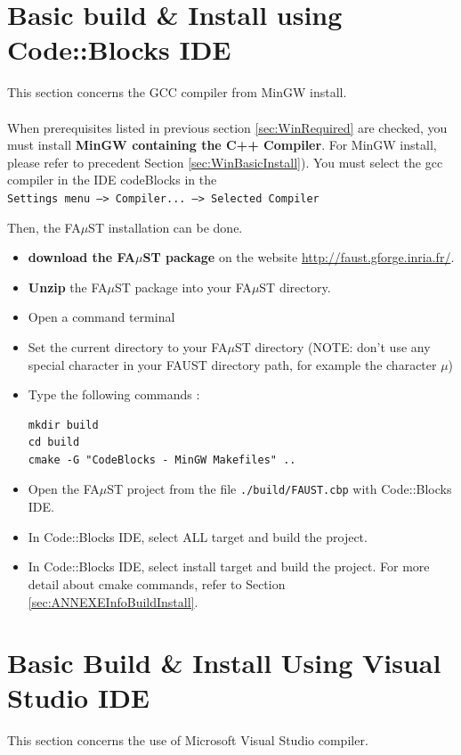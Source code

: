 \section{Basic build \& Install using Code::Blocks IDE}
\label{sec:WinCodeBlocksBasicInstall}
This section concerns the GCC compiler from MinGW install.
\paragraph{}When prerequisites listed in previous section \ref{sec:WinRequired} are checked, you must install \textbf{MinGW containing the C++ Compiler}. For MinGW install, please refer to precedent Section \ref{sec:WinBasicInstall}). 
You must select the gcc compiler in the IDE codeBlocks in the \\ \texttt{Settings menu --> Compiler... --> Selected Compiler }  

Then, the FA$\mu$ST installation can be done. 
\begin{itemize}
\item \textbf{download the FA$\mu$ST package} on the website  \url{http://faust.gforge.inria.fr/}. 
\item \textbf{Unzip} the FA$\mu$ST package into your FA$\mu$ST directory. 

\item Open a command terminal
\item Set the current directory to your FA$\mu$ST directory (NOTE: don't use any special character in your FAUST directory path, for example the character $\mu$)
\item Type the following commands : 
\begin{lstlisting}
mkdir build
cd build
cmake -G "CodeBlocks - MinGW Makefiles" .. 
\end{lstlisting}
\item Open the FA$\mu$ST project from the file \texttt{./build/FAUST.cbp} with Code::Blocks IDE.
\item In Code::Blocks IDE, select ALL target and build the project.
\item In Code::Blocks IDE, select install target and build the project.
For more detail about cmake commands, refer to Section \ref{sec:ANNEXEInfoBuildInstall}.
\end{itemize}


\section{Basic Build \& Install Using Visual Studio IDE}\label{sec:WinVisualStudioBasicInstall}
This section concerns the use of Microsoft Visual Studio compiler.

